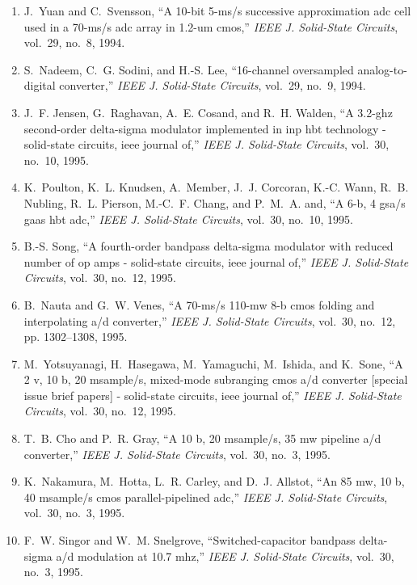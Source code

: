 \begin{enumerate}
\item
J.~Yuan and C.~Svensson, ``A 10-bit 5-ms/s successive approximation adc cell
  used in a 70-ms/s adc array in 1.2-um cmos,'' \emph{{IEEE} J. Solid-State
  Circuits}, vol.~29, no.~8, 1994.

\item
S.~Nadeem, C.~G. Sodini, and H.-S. Lee, ``16-channel oversampled
  analog-to-digital converter,'' \emph{{IEEE} J. Solid-State Circuits},
  vol.~29, no.~9, 1994.

\item
J.~F. Jensen, G.~Raghavan, A.~E. Cosand, and R.~H. Walden, ``A 3.2-ghz
  second-order delta-sigma modulator implemented in inp hbt technology -
  solid-state circuits, ieee journal of,'' \emph{{IEEE} J. Solid-State
  Circuits}, vol.~30, no.~10, 1995.

\item
K.~Poulton, K.~L. Knudsen, A.~Member, J.~J. Corcoran, K.-C. Wann, R.~B.
  Nubling, R.~L. Pierson, M.-C.~F. Chang, and P.~M.~A. and, ``A 6-b, 4 gsa/s
  gaas hbt adc,'' \emph{{IEEE} J. Solid-State Circuits}, vol.~30, no.~10, 1995.

\item
B.-S. Song, ``A fourth-order bandpass delta-sigma modulator with reduced number
  of op amps - solid-state circuits, ieee journal of,'' \emph{{IEEE} J.
  Solid-State Circuits}, vol.~30, no.~12, 1995.

\item
B.~Nauta and G.~W. Venes, ``A 70-ms/s 110-mw 8-b cmos folding and interpolating
  a/d converter,'' \emph{{IEEE} J. Solid-State Circuits}, vol.~30, no.~12, pp.
  1302--1308, 1995.

\item
M.~Yotsuyanagi, H.~Hasegawa, M.~Yamaguchi, M.~Ishida, and K.~Sone, ``A 2 v, 10
  b, 20 msample/s, mixed-mode subranging cmos a/d converter [special issue
  brief papers] - solid-state circuits, ieee journal of,'' \emph{{IEEE} J.
  Solid-State Circuits}, vol.~30, no.~12, 1995.

\item
T.~B. Cho and P.~R. Gray, ``A 10 b, 20 msample/s, 35 mw pipeline a/d
  converter,'' \emph{{IEEE} J. Solid-State Circuits}, vol.~30, no.~3, 1995.

\item
K.~Nakamura, M.~Hotta, L.~R. Carley, and D.~J. Allstot, ``An 85 mw, 10 b, 40
  msample/s cmos parallel-pipelined adc,'' \emph{{IEEE} J. Solid-State
  Circuits}, vol.~30, no.~3, 1995.

\item
F.~W. Singor and W.~M. Snelgrove, ``Switched-capacitor bandpass delta-sigma a/d
  modulation at 10.7 mhz,'' \emph{{IEEE} J. Solid-State Circuits}, vol.~30,
  no.~3, 1995.


\end{enumerate}

